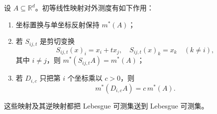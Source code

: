 \begin{lemma}
\label{b1:lem:elementary-linear-maps}
设 \(A\subseteq\mathbb R^d\)。初等线性映射对外测度有如下作用：
\begin{enumerate}
  \item \label{b1:item:0304-elementary-1}坐标置换与单坐标反射保持 \(m^*(A)\)；
  \item \label{b1:item:0304-elementary-2}若 \(S_{ij,t}\) 是剪切变换
  \[
  S_{ij,t}(x)_i=x_i+t x_j,
  \quad S_{ij,t}(x)_k=x_k\quad(k\ne i),
  \]
  其中 \(i\ne j\)，则 \(m^*(S_{ij,t}A)=m^*(A)\)；
  \item \label{b1:item:0304-elementary-3}若 \(D_{i,c}\) 只把第 \(i\) 个坐标乘以 \(c>0\)，则
  \[
  m^*(D_{i,c}A)=c\,m^*(A).
  \]
\end{enumerate}
这些映射及其逆映射都把 Lebesgue 可测集送到 Lebesgue 可测集。
\end{lemma}
